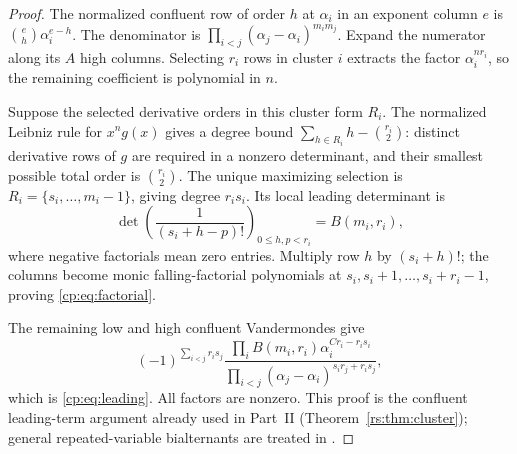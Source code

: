 \documentclass[11pt]{article}
\theoremstyle{definition}
\theoremstyle{remark}
\theoremstyle{definition}
\theoremstyle{plain}
\numberwithin{equation}{section}
\begin{document}
\begin{proof}
The normalized confluent row of order $h$ at $\alpha_i$ in an exponent
column $e$ is $\binom eh\alpha_i^{e-h}$. The denominator is
$\prod_{i<j}(\alpha_j-\alpha_i)^{m_i m_j}$. Expand the numerator along
its $A$ high columns. Selecting $r_i$ rows in cluster $i$ extracts the
factor $\alpha_i^{nr_i}$, so the remaining coefficient is polynomial
in $n$.

Suppose the selected derivative orders in this cluster form $R_i$.
The normalized Leibniz rule for $x^n g(x)$ gives a degree bound
$\sum_{h\in R_i}h-\binom{r_i}{2}$: distinct derivative rows of $g$
are required in a nonzero determinant, and their smallest possible total
order is $\binom{r_i}{2}$. The unique maximizing selection is
$R_i=\{s_i,\ldots,m_i-1\}$, giving degree $r_is_i$.
Its local leading determinant is
\begin{equation}
 \det\left(\frac1{(s_i+h-p)!}\right)_{0\le h,p<r_i}=B(m_i,r_i),
 \label{cp:eq:factorial}
\end{equation}
where negative factorials mean zero entries. Multiply row $h$ by
$(s_i+h)!$; the columns become monic falling-factorial polynomials at
$s_i,s_i+1,\ldots,s_i+r_i-1$, proving \eqref{cp:eq:factorial}.

The remaining low and high confluent Vandermondes give
\[
 (-1)^{\sum_{i<j}r_i s_j}
 \frac{\prod_i B(m_i,r_i)\alpha_i^{Cr_i-r_is_i}}
 {\prod_{i<j}(\alpha_j-\alpha_i)^{s_i r_j+r_i s_j}},
\]
which is \eqref{cp:eq:leading}. All factors are nonzero. This proof is the
confluent leading-term argument already used in Part~II
(Theorem~\ref{rs:thm:cluster}); general
repeated-variable bialternants are treated in \cite{GSM}.
\end{proof}

\end{document}
